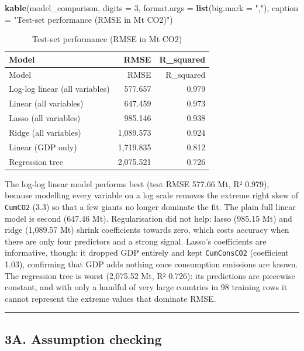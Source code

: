 \documentclass[
]{article}
\newenvironment{Shaded}{\begin{snugshade}}{\end{snugshade}}
\newcommand{\AttributeTok}[1]{\textcolor[rgb]{0.13,0.29,0.53}{#1}}
\newcommand{\DecValTok}[1]{\textcolor[rgb]{0.00,0.00,0.81}{#1}}
\newcommand{\FunctionTok}[1]{\textcolor[rgb]{0.13,0.29,0.53}{\textbf{#1}}}
\newcommand{\NormalTok}[1]{#1}
\newcommand{\StringTok}[1]{\textcolor[rgb]{0.31,0.60,0.02}{#1}}
\begin{document}
\begin{Shaded}
\begin{Highlighting}[]
\FunctionTok{kable}\NormalTok{(model\_comparison, }\AttributeTok{digits =} \DecValTok{3}\NormalTok{, }\AttributeTok{format.args =} \FunctionTok{list}\NormalTok{(}\AttributeTok{big.mark =} \StringTok{","}\NormalTok{),}
      \AttributeTok{caption =} \StringTok{"Test{-}set performance (RMSE in Mt CO2)"}\NormalTok{)}
\end{Highlighting}
\end{Shaded}

\begin{longtable}[]{@{}lrr@{}}
\caption{Test-set performance (RMSE in Mt CO2)}\tabularnewline
\toprule\noalign{}
Model & RMSE & R\_squared \\
\midrule\noalign{}
\endfirsthead
\toprule\noalign{}
Model & RMSE & R\_squared \\
\midrule\noalign{}
\endhead
\bottomrule\noalign{}
\endlastfoot
Log-log linear (all variables) & 577.657 & 0.979 \\
Linear (all variables) & 647.459 & 0.973 \\
Lasso (all variables) & 985.146 & 0.938 \\
Ridge (all variables) & 1,089.573 & 0.924 \\
Linear (GDP only) & 1,719.835 & 0.812 \\
Regression tree & 2,075.521 & 0.726 \\
\end{longtable}

The log-log linear model performs best (test RMSE 577.66 Mt, R² 0.979),
because modelling every variable on a log scale removes the extreme
right skew of \texttt{CumCO2} (3.3) so that a few giants no longer
dominate the fit. The plain full linear model is second (647.46 Mt).
Regularisation did not help: lasso (985.15 Mt) and ridge (1,089.57 Mt)
shrink coefficients towards zero, which costs accuracy when there are
only four predictors and a strong signal. Lasso's coefficients are
informative, though: it dropped GDP entirely and kept
\texttt{CumConsCO2} (coefficient 1.03), confirming that GDP adds nothing
once consumption emissions are known. The regression tree is worst
(2,075.52 Mt, R² 0.726): its predictions are piecewise constant, and
with only a handful of very large countries in 98 training rows it
cannot represent the extreme values that dominate RMSE.

\begin{center}\rule{0.5\linewidth}{0.5pt}\end{center}

\subsection{3A. Assumption checking}\label{a.-assumption-checking}
\end{document}
